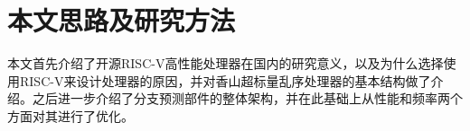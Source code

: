 



\section{本文思路及研究方法}

本文首先介绍了开源RISC-V高性能处理器在国内的研究意义，以及为什么选择使用RISC-V来设计处理器的原因，并对香山超标量乱序处理器的基本结构做了介绍。之后进一步介绍了分支预测部件的整体架构，并在此基础上从性能和频率两个方面对其进行了优化。





